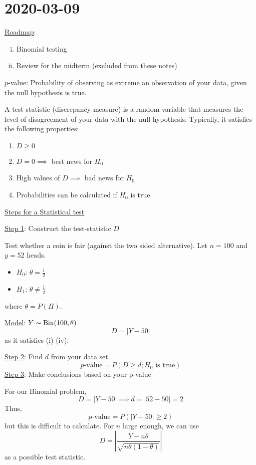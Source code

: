 \section{2020-03-09}
\underline{Roadmap}:
\begin{enumerate}[(i)]
    \item Binomial testing
    \item Review for the midterm (excluded from these notes)
\end{enumerate}
\begin{defbox}
    \begin{definition}
        $ p $-value: Probability of observing as extreme an observation of your data,
        given the null hypothesis is true.
    \end{definition}
\end{defbox}

\begin{defbox}
    \begin{definition}
        A test statistic (discrepancy measure) is a random variable that measures
        the level of disagreement of your data with the null hypothesis. Typically,
        it satisfies the following properties:
        \begin{enumerate}
            \item $ D\geqslant 0 $
            \item $ D=0 \implies $ best news for $ H_0 $
            \item High values of $ D \implies $ bad news for $ H_0 $
            \item Probabilities can be calculated if $ H_0 $ is true
        \end{enumerate}
    \end{definition}
\end{defbox}

\underline{Steps for a Statistical test}

\underline{Step 1}: Construct the test-statistic $ D $
\begin{exbox}
    \begin{example}
        Test whether a coin is fair (against the two sided alternative).
        Let $ n=100 $ and $ y=52 $ heads.
        \begin{itemize}
            \item $ H_0 $: $ \theta=\frac{1}{2} $
            \item $ H_1 $: $ \theta\neq \frac{1}{2} $
        \end{itemize}
        where $ \theta=P(H) $.

        \underline{Model}: $ Y \thicksim \operatorname{Bin}(100,\theta) $.
        \[ D=|Y-50| \]
        as it satisfies (i)-(iv).
    \end{example}
\end{exbox}
\underline{Step 2}: Find $ d $ from your data set.
\[ p\text{-value}=P(D\geqslant d;H_0\text{ is true}) \]
\underline{Step 3}: Make conclusions based on your p-value

For our Binomial problem,
\[ D=|Y-50|\implies d=|52-50|=2 \]
Thus,
\[ p\text{-value}=P(|Y-50|\geqslant 2) \]
but this is difficult to calculate. For $ n $ large enough, we can use
\[ D=\left| \frac{Y-n\theta}{\sqrt{n\theta(1-\theta)}} \right| \]
as a possible test statistic.
